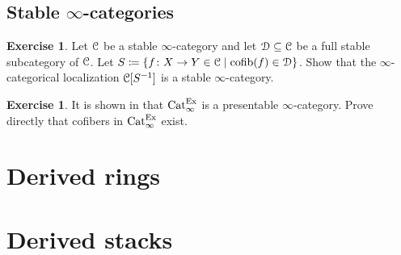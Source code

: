 \documentclass[10pt,a4paper,reqno,oneside]{book} %
\theoremstyle{plain}
\theoremstyle{definition}
\newtheorem{exercise}[thm]{Exercise}
\theoremstyle{remark}
\numberwithin{equation}{section}
\begin{document}
\section{Stable $\infty$-categories}

\begin{exercise}
	Let $\mathcal C$ be a stable $\infty$-category and let $\mathcal D \subseteq \mathcal C$ be a full stable subcategory of $\mathcal C$.
	Let $S \coloneqq \{f \colon X \to Y \in \mathcal C \mid \mathrm{cofib}(f) \in \mathcal D\}$.
	Show that the $\infty$-categorical localization $\mathcal C[S^{-1}]$ is a stable $\infty$-category.
\end{exercise}

\begin{exercise}
	It is shown in \cite{Blumberg_Gepner_Universal_2013} that $\mathrm{Cat}_\infty^{\mathrm{Ex}}$ is a presentable $\infty$-category.
	Prove directly that cofibers in $\mathrm{Cat}_\infty^{\mathrm{Ex}}$ exist.
\end{exercise}

\chapter{Derived rings}



\chapter{Derived stacks}





\end{document}
